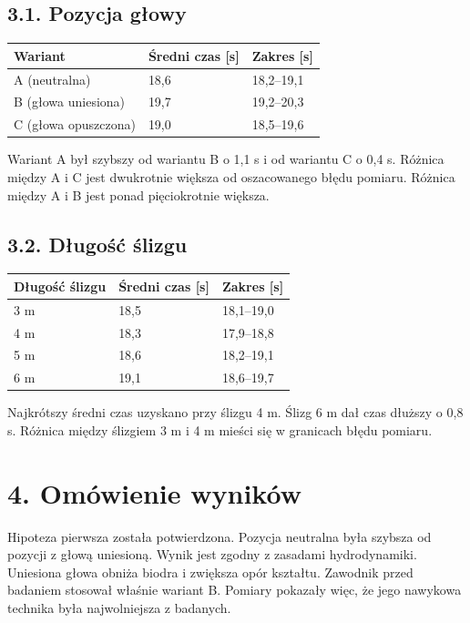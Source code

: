 \subsection*{3.1. Pozycja głowy}
\begin{tabularx}{\textwidth}{@{}lXX@{}}
\toprule
\textbf{Wariant} & \textbf{Średni czas [s]} & \textbf{Zakres [s]} \\
\midrule
A (neutralna) & 18,6 & 18,2--19,1 \\
B (głowa uniesiona) & 19,7 & 19,2--20,3 \\
C (głowa opuszczona) & 19,0 & 18,5--19,6 \\
\bottomrule
\end{tabularx}

\vspace{0.3cm}
Wariant A był szybszy od wariantu B o 1,1 s i od wariantu C o 0,4 s. Różnica między A i C jest dwukrotnie większa od oszacowanego błędu pomiaru. Różnica między A i B jest ponad pięciokrotnie większa.

\subsection*{3.2. Długość ślizgu}
\begin{tabularx}{\textwidth}{@{}lXX@{}}
\toprule
\textbf{Długość ślizgu} & \textbf{Średni czas [s]} & \textbf{Zakres [s]} \\
\midrule
3 m & 18,5 & 18,1--19,0 \\
4 m & 18,3 & 17,9--18,8 \\
5 m & 18,6 & 18,2--19,1 \\
6 m & 19,1 & 18,6--19,7 \\
\bottomrule
\end{tabularx}

\vspace{0.3cm}
Najkrótszy średni czas uzyskano przy ślizgu 4 m. Ślizg 6 m dał czas dłuższy o 0,8 s. Różnica między ślizgiem 3 m i 4 m mieści się w granicach błędu pomiaru.

\section*{4. Omówienie wyników}
Hipoteza pierwsza została potwierdzona. Pozycja neutralna była szybsza od pozycji z głową uniesioną. Wynik jest zgodny z zasadami hydrodynamiki. Uniesiona głowa obniża biodra i zwiększa opór kształtu. Zawodnik przed badaniem stosował właśnie wariant B. Pomiary pokazały więc, że jego nawykowa technika była najwolniejsza z badanych.

